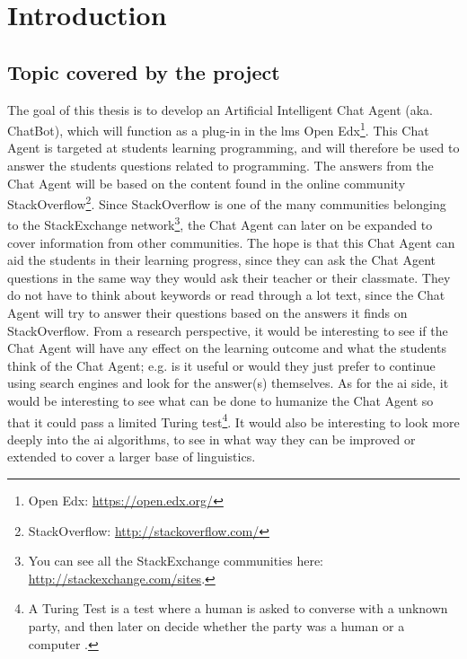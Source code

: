 \chapter{Introduction}
\label{chapter2:introduction}

\section{Topic covered by the project}
\label{chapter2:topic}
The goal of this thesis is to develop an Artificial Intelligent Chat Agent (aka. ChatBot), which will function as a plug-in in the \gls{lms} Open Edx\footnote{Open Edx: 
\url{https://open.edx.org/}}. This Chat Agent is targeted at students learning programming, and will therefore be used to answer the students questions related to programming. 
The answers from the Chat Agent will be based on the content found in the online community StackOverflow\footnote{StackOverflow: \url{http://stackoverflow.com/}}. 
Since StackOverflow is one of the many communities belonging to the StackExchange network\footnote{You can see all the StackExchange communities here: 
\url{http://stackexchange.com/sites}.}, the Chat Agent can later on be expanded to cover information from other communities.
\vspace{0.5em}\newline
The hope is that this Chat Agent can aid the students in their learning progress, since they can ask the Chat Agent questions in the same way they would ask their teacher or 
their classmate. They do not have to think about keywords or read through a lot text, since the Chat Agent will try to answer their questions based on the answers it finds 
on StackOverflow.
\vspace{0.5em}\newline
From a research perspective, it would be interesting to see if the Chat Agent will have any effect on the learning outcome and what the students think of the Chat Agent; e.g. is it 
useful or would they just prefer to continue using search engines and look for the answer(s) themselves. As for the \gls{ai} side, it would be interesting to see what can be done to
humanize the Chat Agent so that it could pass a limited Turing test\footnote{A Turing Test is a test where a human is asked to converse with a unknown party, and then later on decide
whether the party was a human or a computer \citet[p.~2]{Russell2013}.}. It would also be interesting to look more deeply into the \gls{ai} algorithms, to see in what way they can 
be improved or extended to cover a larger base of linguistics.

